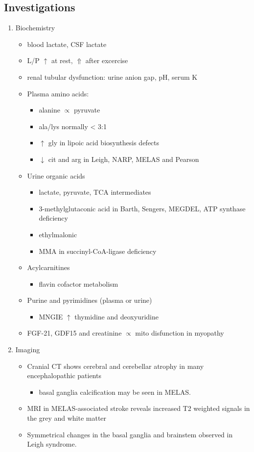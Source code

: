 \documentclass{scrartcl}
\begin{document}
\subsection{Investigations}
\label{sec:org1d24b09}
\begin{enumerate}
\item Biochemistry
\label{sec:orgda3b52d}
\begin{itemize}
\item blood lactate, CSF lactate
\item L/P \(\uparrow\) at rest, \(\Uparrow\) after excercise
\item renal tubular dysfunction: urine anion gap, pH, serum K
\item Plasma amino acids:
\begin{itemize}
\item alanine \(\propto\) pyruvate
\item ala/lys normally \textless{} 3:1
\item \(\uparrow\) gly in lipoic acid biosynthesis defects
\item \(\downarrow\) cit and arg in Leigh, NARP, MELAS and Pearson
\end{itemize}
\item Urine organic acids
\begin{itemize}
\item lactate, pyruvate, TCA intermediates
\item 3-methylglutaconic acid in Barth, Sengers, MEGDEL, ATP synthase deficiency
\item ethylmalonic
\item MMA in succinyl-CoA-ligase deficiency
\end{itemize}
\item Acylcarnitines
\begin{itemize}
\item flavin cofactor metabolism
\end{itemize}
\item Purine and pyrimidines (plasma or urine)
\begin{itemize}
\item MNGIE \(\uparrow\) thymidine and deoxyuridine
\end{itemize}
\item FGF-21, GDF15 and creatinine \(\propto\) mito disfunction in myopathy
\end{itemize}

\item Imaging
\label{sec:orgc98e75c}
\begin{itemize}
\item Cranial CT shows cerebral and cerebellar atrophy in many encephalopathic patients
\begin{itemize}
\item basal ganglia calcification may be seen in MELAS.
\end{itemize}
\item MRI in MELAS-associated stroke reveals increased T2 weighted signals in the grey and white matter
\item Symmetrical changes in the basal ganglia and brainstem observed in Leigh syndrome.
\end{itemize}


\end{enumerate}
\end{document}
